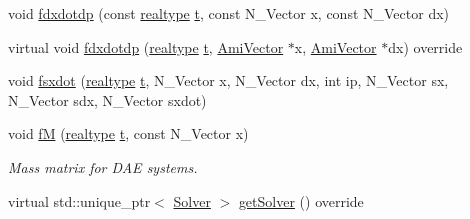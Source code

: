 \begin{DoxyCompactItemize}
\item 
void \mbox{\hyperlink{classamici_1_1_model___d_a_e_a551dfccd2fb1aa618c644a580639f5b8}{fdxdotdp}} (const \mbox{\hyperlink{namespaceamici_a1bdce28051d6a53868f7ccbf5f2c14a3}{realtype}} \mbox{\hyperlink{classamici_1_1_model_a711281d57e9710226face29151cc4641}{t}}, const N\+\_\+\+Vector x, const N\+\_\+\+Vector dx)
\item 
virtual void \mbox{\hyperlink{classamici_1_1_model___d_a_e_afd60580b84c72713288796453f6da33a}{fdxdotdp}} (\mbox{\hyperlink{namespaceamici_a1bdce28051d6a53868f7ccbf5f2c14a3}{realtype}} \mbox{\hyperlink{classamici_1_1_model_a711281d57e9710226face29151cc4641}{t}}, \mbox{\hyperlink{classamici_1_1_ami_vector}{Ami\+Vector}} $\ast$x, \mbox{\hyperlink{classamici_1_1_ami_vector}{Ami\+Vector}} $\ast$dx) override
\item 
void \mbox{\hyperlink{classamici_1_1_model___d_a_e_a26e76f86f173a718466c9cc19d68550a}{fsxdot}} (\mbox{\hyperlink{namespaceamici_a1bdce28051d6a53868f7ccbf5f2c14a3}{realtype}} \mbox{\hyperlink{classamici_1_1_model_a711281d57e9710226face29151cc4641}{t}}, N\+\_\+\+Vector x, N\+\_\+\+Vector dx, int ip, N\+\_\+\+Vector sx, N\+\_\+\+Vector sdx, N\+\_\+\+Vector sxdot)
\item 
void \mbox{\hyperlink{classamici_1_1_model___d_a_e_a82db0639f98056acc376569457c95ca4}{fM}} (\mbox{\hyperlink{namespaceamici_a1bdce28051d6a53868f7ccbf5f2c14a3}{realtype}} \mbox{\hyperlink{classamici_1_1_model_a711281d57e9710226face29151cc4641}{t}}, const N\+\_\+\+Vector x)
\begin{DoxyCompactList}\small\item\em Mass matrix for D\+AE systems. \end{DoxyCompactList}\item 
virtual std\+::unique\+\_\+ptr$<$ \mbox{\hyperlink{classamici_1_1_solver}{Solver}} $>$ \mbox{\hyperlink{classamici_1_1_model___d_a_e_aee7564098e889917627afd3c00772f81}{get\+Solver}} () override
\end{DoxyCompactItemize}
